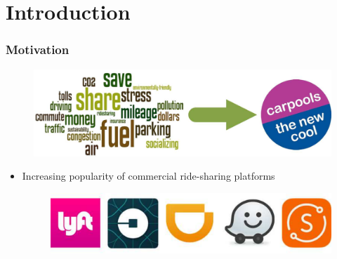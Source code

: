 \documentclass[t]{beamer}
\begin{document}
\section*{Introduction}
\begin{frame}\frametitle{Motivation}
\begin{figure}
	\centering
    \includegraphics[width = 0.75\columnwidth]{carpool}
\end{figure}
\begin{itemize}
\item<2-> Increasing popularity of commercial ride-sharing platforms
\begin{figure}
	\centering
    \includegraphics[width = 0.55\columnwidth]{ride-sharings}
\end{figure}
\end{itemize}
\end{frame}
\end{document}
